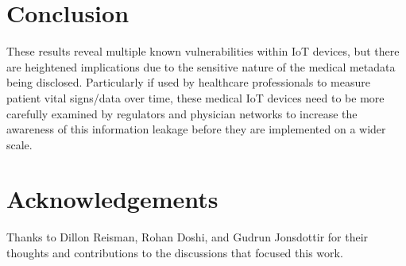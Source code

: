 \section{Conclusion}

These results reveal multiple known vulnerabilities within IoT devices, but there are heightened implications due to the sensitive nature of the medical metadata being disclosed. Particularly if used by healthcare professionals to measure patient vital signs/data over time, these medical IoT devices need to be more carefully examined by regulators and physician networks to increase the awareness of this information leakage before they are implemented on a wider scale. 

\appendix

\section*{Acknowledgements}
Thanks to Dillon Reisman, Rohan Doshi, and Gudrun Jonsdottir for their thoughts and contributions to the discussions that focused this work. 
